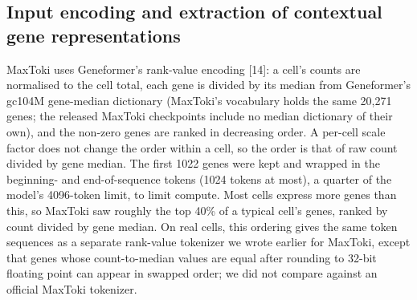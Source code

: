 \documentclass[
  11pt,
]{article}
\begin{document}
\subsection{Input encoding and extraction of contextual gene
representations}\label{input-encoding-and-extraction-of-contextual-gene-representations}

MaxToki uses Geneformer's rank-value encoding {[}14{]}: a cell's counts
are normalised to the cell total, each gene is divided by its median
from Geneformer's gc104M gene-median dictionary (MaxToki's vocabulary
holds the same 20,271 genes; the released MaxToki checkpoints include no
median dictionary of their own), and the non-zero genes are ranked in
decreasing order. A per-cell scale factor does not change the order
within a cell, so the order is that of raw count divided by gene median.
The first 1022 genes were kept and wrapped in the beginning- and
end-of-sequence tokens (1024 tokens at most), a quarter of the model's
4096-token limit, to limit compute. Most cells express more genes than
this, so MaxToki saw roughly the top 40\% of a typical cell's genes,
ranked by count divided by gene median. On real cells, this ordering
gives the same token sequences as a separate rank-value tokenizer we
wrote earlier for MaxToki, except that genes whose count-to-median
values are equal after rounding to 32-bit floating point can appear in
swapped order; we did not compare against an official MaxToki tokenizer.
\end{document}
